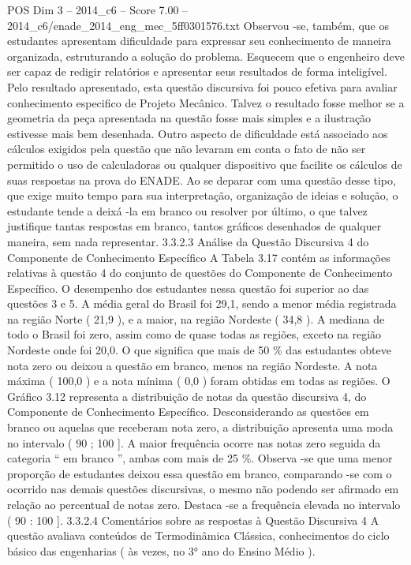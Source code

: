 \begin{textsample}{POS Dim 3 – 2014\_c6 – Score 7.00 – 2014\_c6/enade\_2014\_eng\_mec\_5ff0301576.txt}
Observou -se, também, que os estudantes apresentam dificuldade para expressar seu conhecimento de maneira organizada, estruturando a solução do problema.
Esquecem que o engenheiro deve ser capaz de redigir relatórios e apresentar seus resultados de forma inteligível.
Pelo resultado apresentado, esta questão discursiva foi pouco efetiva para avaliar conhecimento especifico de Projeto Mecânico.
Talvez o resultado fosse melhor se a geometria da peça apresentada na questão fosse mais simples e a ilustração estivesse mais bem desenhada.
Outro aspecto de dificuldade está associado aos cálculos exigidos pela questão que não levaram em conta o fato de não ser permitido o uso de calculadoras ou qualquer dispositivo que facilite os cálculos de suas respostas na prova do ENADE.
Ao se deparar com uma questão desse tipo, que exige muito tempo para sua interpretação, organização de ideias e solução, o estudante tende a deixá -la em branco ou resolver por último, o que talvez justifique tantas respostas em branco, tantos gráficos desenhados de qualquer maneira, sem nada representar. 3.3.2.3 Análise da Questão Discursiva 4 do Componente de Conhecimento Específico A Tabela 3.17 contém as informações relativas à questão 4 do conjunto de questões do Componente de Conhecimento Específico.
O desempenho dos estudantes nessa questão foi superior ao das questões 3 e 5.
A média geral do Brasil foi 29,1, sendo a menor média registrada na região Norte ( 21,9 ), e a maior, na região Nordeste ( 34,8 ).
A mediana de todo o Brasil foi zero, assim como de quase todas as regiões, exceto na região Nordeste onde foi 20,0.
O que significa que mais de 50 \% das estudantes obteve nota zero ou deixou a questão em branco, menos na região Nordeste.
A nota máxima ( 100,0 ) e a nota mínima ( 0,0 ) foram obtidas em todas as regiões.
O Gráfico 3.12 representa a distribuição de notas da questão discursiva 4, do Componente de Conhecimento Específico.
Desconsiderando as questões em branco ou aquelas que receberam nota zero, a distribuição apresenta uma moda no intervalo ( 90 ; 100 ].
A maior frequência ocorre nas notas zero seguida da categoria “ em branco ”, ambas com mais de 25 \%.
Observa -se que uma menor proporção de estudantes deixou essa questão em branco, comparando -se com o ocorrido nas demais questões discursivas, o mesmo não podendo ser afirmado em relação ao percentual de notas zero.
Destaca -se a frequência elevada no intervalo ( 90 : 100 ]. 3.3.2.4 Comentários sobre as respostas à Questão Discursiva 4 A questão avaliava conteúdos de Termodinâmica Clássica, conhecimentos do ciclo básico das engenharias ( às vezes, no 3{\EmojiFont °} ano do Ensino Médio ).

\end{textsample}
